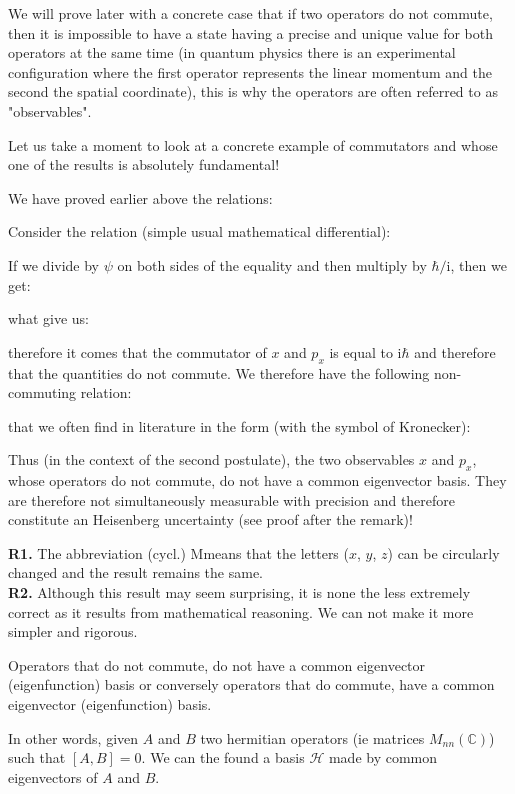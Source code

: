 	We will prove later with a concrete case that if two operators do not commute, then it is impossible to have a state having a precise and unique value for both operators at the same time (in quantum physics there is an experimental configuration where the first operator represents the linear momentum and the second the spatial coordinate), this is why the operators are often referred to as "observables".
	
	Let us take a moment to look at a concrete example of commutators and whose one of the results is absolutely fundamental!

	We have proved earlier above the relations:
	
	Consider the relation (simple usual mathematical differential):
	
	If we divide by $\psi$ on both sides of the equality and then multiply by $\hbar/\mathrm{i}$, then we get:
	
	what give us:
	
	therefore it comes that the commutator of $x$ and $p_x$ is equal to $\mathrm{i}\hbar$ and therefore that the quantities do not commute. We therefore have the following non-commuting relation\label{second quantum uncertainty relation}:
	
	that we often find in literature in the form (with the symbol of Kronecker):
	
	Thus (in the context of the second postulate), the two observables $x$ and $p_x$, whose operators do not commute, do not have a common eigenvector basis. They are therefore not simultaneously measurable with precision and therefore constitute an Heisenberg uncertainty (see proof after the remark)!
	\begin{tcolorbox}[title=Remarks,colframe=black,arc=10pt]
	\textbf{R1.} The abbreviation (cycl.) Mmeans that the letters ($x$, $y$, $z$) can be circularly changed and the result remains the same.\\
	
	\textbf{R2.} Although this result may seem surprising, it is none the less extremely correct as it results from mathematical reasoning. We can not make it more simpler and rigorous.\\
	\end{tcolorbox}
	\begin{theorem}
	Operators that do not commute, do not have a common eigenvector (eigenfunction) basis or conversely operators that do commute, have a common eigenvector (eigenfunction) basis.
	
	In other words, given $A$ and $B$ two hermitian operators (ie matrices $M_{nn}(\mathbb{C})$) such that $[A,B]=0$. We can the found a basis $\mathcal{H}$ made by common eigenvectors of $A$ and $B$.
	\end{theorem}

